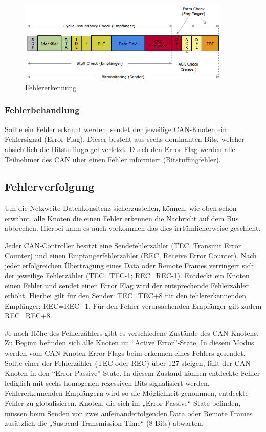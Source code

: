 \begin{figure}[h] 
\centering
\includegraphics[width=0.9\textwidth]{figures/errcheck}
\caption{Fehlererkennung \citep{VEC}} 
\label{pic:errcheck}
\end{figure} 

\subsubsection{Fehlerbehandlung}

Sollte ein Fehler erkannt werden, sendet der jeweilige CAN-Knoten ein Fehlersignal (Error-Flag). Dieser
besteht aus sechs dominanten Bits, welcher absichtlich die Bitstuffingregel verletzt. Durch den Error-Flag
werden alle Teilnehmer des CAN über einen Fehler informiert (Bitstuffingfehler).

\subsection{Fehlerverfolgung}

Um die Netzweite Datenkonsitenz sicherzustellen, können, wie oben schon erwähnt, alle Knoten die einen 
Fehler erkennen die Nachricht auf dem Bus abbrechen. Hierbei kann es auch vorkommen das dies 
irrtümlicherweise geschieht.

Jeder CAN-Controller besitzt eine Sendefehlerzähler (TEC, Transmit Error Counter) und einen 
Empfängerfehlerzähler (REC, Receive Error Counter). Nach jeder erfolgreichen Übertragung eines 
Data oder Remote Frames verringert sich der jeweilige Fehlerzähler (TEC=TEC-1; REC=REC-1). 
Entdeckt ein Knoten einen Fehler und sendet einen Error Flag wird der entsprechende Fehlerzähler 
erhöht. Hierbei gilt für den Sender: TEC=TEC+8 für den fehlererkennenden Empfänger: REC=REC+1.
Für den Fehler verursachenden Empfänger gilt zudem REC=REC+8.

Je nach Höhe des Fehlerzählers gibt es verschiedene Zustände des CAN-Knotens. Zu Beginn befinden
sich alle Knoten im ``Active Error''-State. In diesem Modus werden vom CAN-Knoten Error Flags beim 
erkennen eines Fehlers gesendet. Sollte einer der Fehlerzähler (TEC oder REC) über 127 steigen, fällt 
der CAN-Knoten in den ``Error Passive''-State. In diesem Zustand können entdeckte Fehler lediglich 
mit sechs homogenen rezessiven Bits signalisiert werden. Fehlererkennenden Empfängern wird so die 
Möglichkeit genommen, entdeckte Fehler zu globalisieren. Knoten, die sich im „Error Passive“-State 
befinden, müssen beim Senden von zwei aufeinanderfolgenden Data oder Remote Frames zusätzlich 
die „Suspend Transmission Time“ (8 Bits) abwarten.

